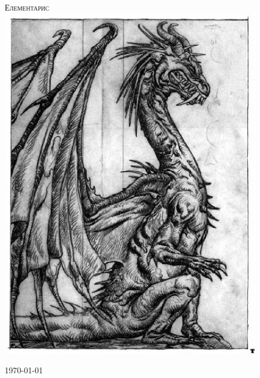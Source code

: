 \begin{titlepage}
\begin{center}

\textsc{\Huge Елементарис}\\[1.5cm]
\includegraphics[width=0.85\textwidth]{../images/dragon}~
\\[1cm]

\vfill

\today

\end{center}
\end{titlepage}
